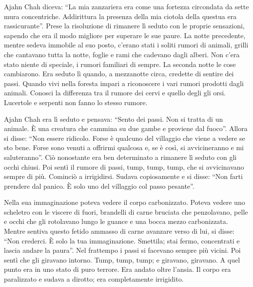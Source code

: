 Ajahn Chah diceva: ``La mia zanzariera era come una fortezza circondata da sette mura concentriche. Addirittura la presenza della mia ciotola della questua era rassicurante''. Prese la risoluzione di rimanere lì seduto con le proprie sensazioni, sapendo che era il modo migliore per superare le sue paure. La notte precedente, mentre sedeva immobile al suo posto, c'erano stati i soliti rumori di animali, grilli che cantavano tutta la notte, foglie e rami che cadevano dagli alberi. Non c'era stato niente di speciale, i rumori familiari di sempre. La seconda notte le cose cambiarono. Era seduto lì quando, a mezzanotte circa, credette di sentire dei passi. Quando vivi nella foresta impari a riconoscere i vari rumori prodotti dagli animali. Conosci la differenza tra il rumore dei cervi e quello degli gli orsi. Lucertole e serpenti non fanno lo stesso rumore. 

Ajahn Chah era lì seduto e pensava: ``Sento dei passi. Non si tratta di un animale. È una creatura che cammina su due gambe e proviene dal fuoco''. Allora si disse: ``Non essere ridicolo. Forse è qualcuno del villaggio che viene a vedere se sto bene. Forse sono venuti a offrirmi qualcosa e, se è così, si avvicineranno e mi saluteranno''. Ciò nonostante era ben determinato a rimanere lì seduto con gli occhi chiusi. Poi sentì il rumore di passi, tump, tump, tump, che si avvicinavano sempre di più. Cominciò a irrigidirsi. Sudava copiosamente e si disse: ``Non farti prendere dal panico. È solo uno del villaggio col passo pesante''.

Nella sua immaginazione poteva vedere il corpo carbonizzato. Poteva vedere uno scheletro con le viscere di fuori, brandelli di carne bruciata che penzolavano, pelle e occhi che gli rotolavano lungo le guance e una bocca mezzo carbonizzata. Mentre sentiva questo fetido ammasso di carne avanzare verso di lui, si disse: ``Non crederci. È solo la tua immaginazione. Smettila; stai fermo, concentrati e lascia andare la paura''. Nel frattempo i passi si facevano sempre più vicini. Poi sentì che gli giravano intorno. Tump, tump, tump; e giravano, giravano. A quel punto era in uno stato di puro terrore. Era andato oltre l'ansia. Il corpo era paralizzato e sudava a dirotto; era completamente irrigidito.


